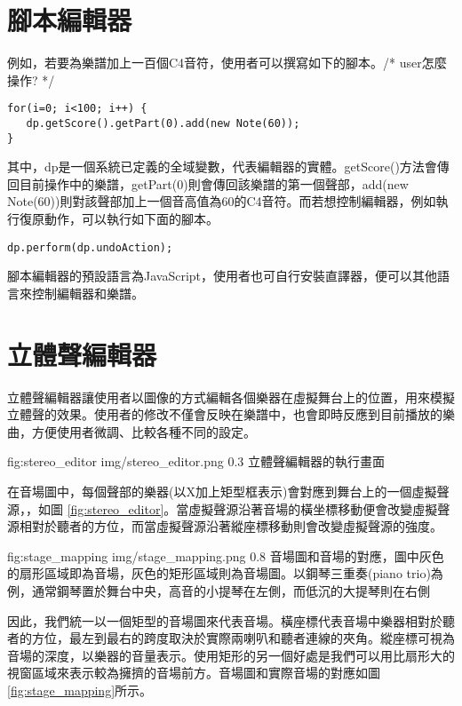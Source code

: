 \documentclass[12pt,a4paper,oneside]{report}
\begin{document}
\section{腳本編輯器}

例如，若要為樂譜加上一百個C4音符，使用者可以撰寫如下的腳本。/* user怎麼操作? */

\begin{verbatim}
for(i=0; i<100; i++) { 
   dp.getScore().getPart(0).add(new Note(60));
}
\end{verbatim}

其中，dp是一個系統已定義的全域變數，代表編輯器的實體。getScore()方法會傳回目前操作中的樂譜，getPart(0)則會傳回該樂譜的第一個聲部，add(new Note(60))則對該聲部加上一個音高值為60的C4音符。而若想控制編輯器，例如執行復原動作，可以執行如下面的腳本。

\begin{verbatim}
dp.perform(dp.undoAction);
\end{verbatim}

腳本編輯器的預設語言為JavaScript，使用者也可自行安裝直譯器，便可以其他語言來控制編輯器和樂譜。

\section{立體聲編輯器}
立體聲編輯器讓使用者以圖像的方式編輯各個樂器在虛擬舞台上的位置，用來模擬立體聲的效果。使用者的修改不僅會反映在樂譜中，也會即時反應到目前播放的樂曲，方便使用者微調、比較各種不同的設定。

\figurewithcaption
{fig:stereo_editor}
{img/stereo_editor.png}
{0.3}
{立體聲編輯器的執行畫面}

在音場圖中，每個聲部的樂器(以X加上矩型框表示)會對應到舞台上的一個虛擬聲源，，如圖 \ref{fig:stereo_editor}。當虛擬聲源沿著音場的橫坐標移動便會改變虛擬聲源相對於聽者的方位，而當虛擬聲源沿著縱座標移動則會改變虛擬聲源的強度。

\figurewithcaption
{fig:stage_mapping}
{img/stage_mapping.png}
{0.8}
{音場圖和音場的對應，圖中灰色的扇形區域即為音場，灰色的矩形區域則為音場圖。以鋼琴三重奏(piano trio)為例，通常鋼琴置於舞台中央，高音的小提琴在左側，而低沉的大提琴則在右側}

因此，我們統一以一個矩型的音場圖來代表音場。橫座標代表音場中樂器相對於聽者的方位，最左到最右的跨度取決於實際兩喇叭和聽者連線的夾角。縱座標可視為音場的深度，以樂器的音量表示。使用矩形的另一個好處是我們可以用比扇形大的視窗區域來表示較為擁擠的音場前方。音場圖和實際音場的對應如圖 \ref{fig:stage_mapping}所示。
\end{document}
